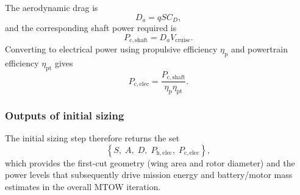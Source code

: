 \documentclass[11pt, a4paper]{article}
\begin{document}
The aerodynamic drag is
\begin{equation}
D_a=qSC_D,
\end{equation}
and the corresponding shaft power required is
\begin{equation}
P_{\mathrm{c,shaft}}=D_a V_\mathrm{cruise}.
\end{equation}
Converting to electrical power using propulsive efficiency $\eta_\mathrm{p}$ and powertrain efficiency $\eta_\mathrm{pt}$ gives
\begin{equation}
P_{\mathrm{c,elec}}=\frac{P_{\mathrm{c,shaft}}}{\eta_\mathrm{p}\eta_\mathrm{pt}}.
\end{equation}

\subsubsection{Outputs of initial sizing}
The initial sizing step therefore returns the set
\begin{equation}
\left\{S,\;A,\;D,\;P_{\mathrm{h,elec}},\;P_{\mathrm{c,elec}}\right\},
\end{equation}
which provides the first-cut geometry (wing area and rotor diameter) and the power levels that subsequently drive mission energy and battery/motor mass estimates in the overall MTOW iteration.







\end{document}
